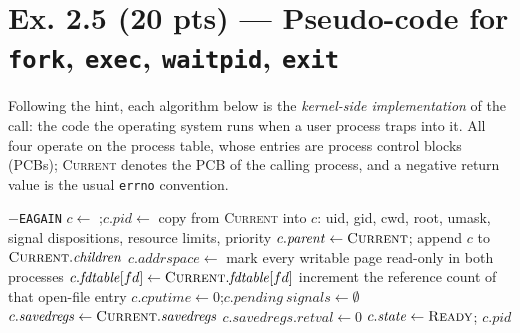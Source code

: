 \section*{Ex. 2.5 (20 pts) --- Pseudo-code for \texttt{fork}, \texttt{exec}, \texttt{waitpid}, \texttt{exit}}

Following the hint, each algorithm below is the \emph{kernel-side implementation} of the
call: the code the operating system runs when a user process traps into it. All four
operate on the process table, whose entries are process control blocks (PCBs);
\textsc{Current} denotes the PCB of the calling process, and a negative return value is
the usual \texttt{errno} convention.

\begin{algorithm}[H]
\caption{\texttt{fork()} --- create a copy of the calling process}
\label{p4:alg:fork}
\begin{algorithmic}[1]
    \State \Return $-$\texttt{EAGAIN}
  \EndIf
  \State $c \gets$ ;\quad $c.\mathit{pid} \gets$ 
  \State copy from \textsc{Current} into $c$: uid, gid, cwd, root, umask,
         \Statex \hspace{\algorithmicindent} signal dispositions, resource limits, priority
  \State $c.\mathit{parent} \gets \textsc{Current}$; append $c$ to $\textsc{Current}.\mathit{children}$
  \State $c.\mathit{addrspace} \gets$ 
  \State mark every writable page read-only in both processes
    \State $c.\mathit{fdtable}[fd] \gets \textsc{Current}.\mathit{fdtable}[fd]$
    \State increment the reference count of that open-file entry
  \EndFor
  \State $c.\mathit{cputime} \gets 0$;\quad $c.\mathit{pending\ signals} \gets \emptyset$
  \State $c.\mathit{savedregs} \gets \textsc{Current}.\mathit{savedregs}$
  \State $c.\mathit{savedregs}.\mathit{retval} \gets 0$
  \State $c.\mathit{state} \gets \textsc{Ready}$; 
  \State \Return $c.\mathit{pid}$
\EndProcedure
\end{algorithmic}
\end{algorithm}

